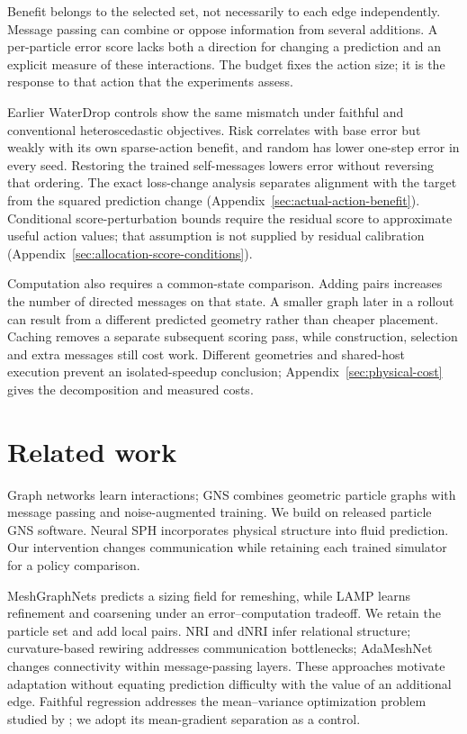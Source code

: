 Benefit belongs to the selected set, not necessarily to each edge independently. Message passing can combine or oppose information from several additions. A per-particle error score lacks both a direction for changing a prediction and an explicit measure of these interactions. The budget fixes the action size; it is the response to that action that the experiments assess.

Earlier WaterDrop controls show the same mismatch under faithful and conventional heteroscedastic objectives. Risk correlates with base error but weakly with its own sparse-action benefit, and random has lower one-step error in every seed. Restoring the trained self-messages lowers error without reversing that ordering. The exact loss-change analysis separates alignment with the target from the squared prediction change (Appendix~\ref{sec:actual-action-benefit}). Conditional score-perturbation bounds require the residual score to approximate useful action values; that assumption is not supplied by residual calibration (Appendix~\ref{sec:allocation-score-conditions}).

Computation also requires a common-state comparison. Adding pairs increases the number of directed messages on that state. A smaller graph later in a rollout can result from a different predicted geometry rather than cheaper placement. Caching removes a separate subsequent scoring pass, while construction, selection and extra messages still cost work. Different geometries and shared-host execution prevent an isolated-speedup conclusion; Appendix~\ref{sec:physical-cost} gives the decomposition and measured costs.

\section{Related work}
Graph networks learn interactions\citep{battaglia2016}; GNS combines geometric particle graphs with message passing and noise-augmented training\citep{sanchez2020}. We build on released particle GNS software\citep{kumar2023}. Neural SPH incorporates physical structure into fluid prediction\citep{toshev2024}. Our intervention changes communication while retaining each trained simulator for a policy comparison.

MeshGraphNets predicts a sizing field for remeshing\citep{pfaff2021}, while LAMP learns refinement and coarsening under an error--computation tradeoff\citep{wu2023}. We retain the particle set and add local pairs. NRI and dNRI infer relational structure\citep{kipf2018,graber2020}; curvature-based rewiring addresses communication bottlenecks\citep{topping2022}; AdaMeshNet changes connectivity within message-passing layers\citep{seo2025}. These approaches motivate adaptation without equating prediction difficulty with the value of an additional edge. Faithful regression\citep{stirn2023} addresses the mean--variance optimization problem studied by \citet{seitzer2022}; we adopt its mean-gradient separation as a control.

